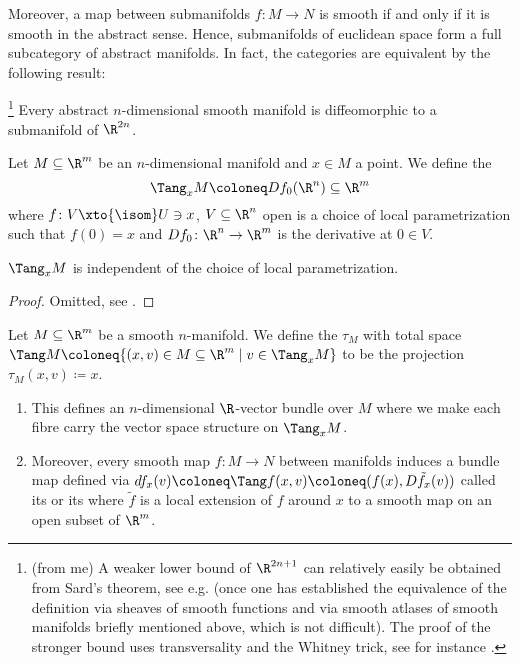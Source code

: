 Moreover, a map between submanifolds $f\colon M \to N$ is smooth if and only if it is smooth in the abstract sense. 
Hence, submanifolds of euclidean space form a full subcategory of abstract manifolds.
In fact, the categories are equivalent by the following result:
\begin{theorem}\footnote{(from me) A weaker lower bound of $\R^{2n + 1}$ can relatively easily be obtained from Sard's theorem, see e.g. \cite[Theorem 6.15]{lee_introduction_2012} (once one has established the equivalence of the definition via sheaves of smooth functions and via smooth atlases of smooth manifolds briefly mentioned above, which is not difficult). The proof of the stronger bound uses transversality and the Whitney trick, see for instance \cite{whitney_self-intersections_1944}.}
	Every abstract $n$-dimensional smooth manifold is diffeomorphic to a submanifold of $\R^{2n}$.
\end{theorem}
Let $M \subseteq \R^m$ be an $n$-dimensional manifold and $x \in M$ a point.
We define the 
\begin{equation*}
	\Tang_x M \coloneq D f_0(\R^n) \subseteq \R^m
\end{equation*}
where $f\colon V \xto{\isom} U \ni x$, $V \subseteq \R^n$ open is a choice of local parametrization such that $f(0) = x$ and $D f_0\colon \R^n \to \R^m$ is the derivative at $0 \in V$.
\begin{lemma}
	$\Tang_x M$ is independent of the choice of local parametrization.
\end{lemma}
\begin{proof}
	Omitted, see \cite[Section 1]{milnor_characteristic_1974}.
\end{proof}
\begin{definition}
	Let $M \subseteq \R^m$ be a smooth $n$-manifold.
	We define the  $\tau_M$ with total space $\Tang M \coloneq \{(x, v) \in M \subseteq \R^m \mid v \in \Tang_x M\}$ to be the projection $\tau_M(x, v) \coloneq x$.
\end{definition}
\begin{lemma}
	\leavevmode
	\begin{enumerate}
		\item This defines an $n$-dimensional $\R$-vector bundle over $M$ where we make each fibre carry the vector space structure on $\Tang_x M$.
		\item Moreover, every smooth map $f\colon M \to N$ between manifolds induces a bundle map defined via $d f_x(v) \coloneq \Tang f(x, v) \coloneq (f(x), D \tilde{f}_x(v))$ called its  or its  where $\tilde{f}$ is a local extension of $f$ around $x$ to a smooth map on an open subset of $\R^m$.
	\end{enumerate}
\end{lemma}

